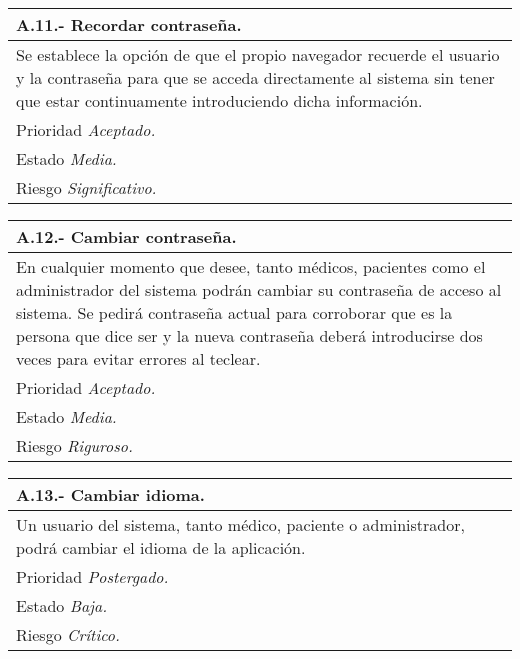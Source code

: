 \documentclass[a4paper,oneside,11pt]{book}
\begin{document}
\begin{center}
\begin{tabulary}{15cm}{|L|}
	\hline
		\bf{A.11.- Recordar contraseña.} \\
	\hline
		Se establece la opción de que el propio navegador recuerde el usuario y la contraseña para que se acceda directamente al sistema sin tener que estar continuamente introduciendo dicha información. \\
	\hline
		Prioridad \textit{Aceptado.} \\
	\hline
		Estado \textit{Media.} \\
	\hline
		Riesgo \textit{Significativo.} \\
	\hline
\end{tabulary}
\end{center}

\begin{center}
\begin{tabulary}{15cm}{|L|}
	\hline
		\bf{A.12.- Cambiar contraseña.} \\
	\hline
		En cualquier momento que desee, tanto médicos, pacientes como el administrador del sistema podrán cambiar su contraseña de acceso al sistema. Se pedirá contraseña actual para corroborar que es la persona que dice ser y la nueva contraseña deberá introducirse dos veces para evitar errores al teclear. \\
	\hline
		Prioridad \textit{Aceptado.} \\
	\hline
		Estado \textit{Media.} \\
	\hline
		Riesgo \textit{Riguroso.} \\
	\hline
\end{tabulary}
\end{center}

\begin{center}
\begin{tabulary}{15cm}{|L|}
	\hline
		\bf{A.13.- Cambiar idioma.} \\
	\hline
		Un usuario del sistema, tanto médico, paciente o administrador, podrá cambiar el idioma de la aplicación. \\
	\hline
		Prioridad \textit{Postergado.} \\
	\hline
		Estado \textit{Baja.} \\
	\hline
		Riesgo \textit{Crítico.} \\
	\hline
\end{tabulary}
\end{center}
\end{document}
